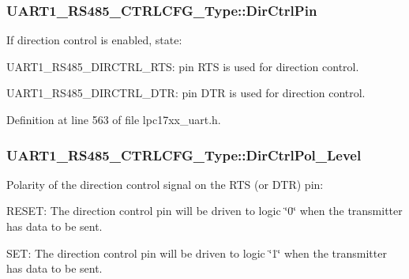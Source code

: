 \subsubsection[{\texorpdfstring{Dir\+Ctrl\+Pin}{DirCtrlPin}}]{ U\+A\+R\+T1\+\_\+\+R\+S485\+\_\+\+C\+T\+R\+L\+C\+F\+G\+\_\+\+Type\+::\+Dir\+Ctrl\+Pin}\hypertarget{struct_u_a_r_t1___r_s485___c_t_r_l_c_f_g___type_acfebf68b0964d3117933ff33be054227}{}\label{struct_u_a_r_t1___r_s485___c_t_r_l_c_f_g___type_acfebf68b0964d3117933ff33be054227}
If direction control is enabled, state\+:
\begin{DoxyItemize}
\item U\+A\+R\+T1\+\_\+\+R\+S485\+\_\+\+D\+I\+R\+C\+T\+R\+L\+\_\+\+R\+TS\+: pin R\+TS is used for direction control.
\item U\+A\+R\+T1\+\_\+\+R\+S485\+\_\+\+D\+I\+R\+C\+T\+R\+L\+\_\+\+D\+TR\+: pin D\+TR is used for direction control. 
\end{DoxyItemize}

Definition at line 563 of file lpc17xx\+\_\+uart.\+h.

\subsubsection[{\texorpdfstring{Dir\+Ctrl\+Pol\+\_\+\+Level}{DirCtrlPol_Level}}]{ U\+A\+R\+T1\+\_\+\+R\+S485\+\_\+\+C\+T\+R\+L\+C\+F\+G\+\_\+\+Type\+::\+Dir\+Ctrl\+Pol\+\_\+\+Level}\hypertarget{struct_u_a_r_t1___r_s485___c_t_r_l_c_f_g___type_a8ef36fc7dfce726385b7114fb8429589}{}\label{struct_u_a_r_t1___r_s485___c_t_r_l_c_f_g___type_a8ef36fc7dfce726385b7114fb8429589}
Polarity of the direction control signal on the R\+TS (or D\+TR) pin\+:
\begin{DoxyItemize}
\item R\+E\+S\+ET\+: The direction control pin will be driven to logic \char`\"{}0\char`\"{} when the transmitter has data to be sent.
\item S\+ET\+: The direction control pin will be driven to logic \char`\"{}1\char`\"{} when the transmitter has data to be sent. 
\end{DoxyItemize}

